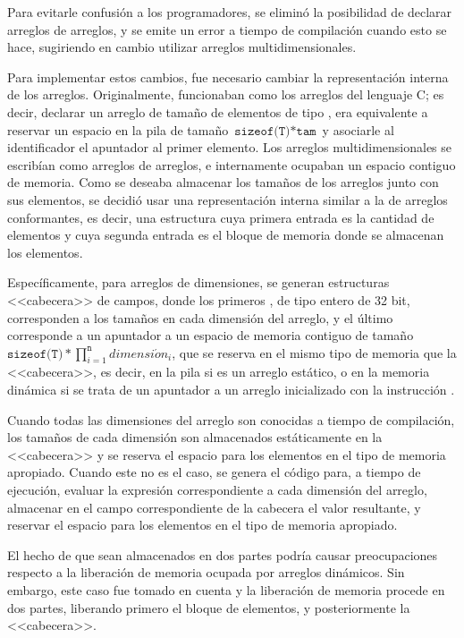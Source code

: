 Para evitarle confusión a los programadores, se eliminó la posibilidad de
declarar arreglos de arreglos, y se emite un error a tiempo de compilación
cuando esto se hace, sugiriendo en cambio utilizar arreglos multidimensionales.

Para implementar estos cambios, fue necesario cambiar la representación interna
de los arreglos. Originalmente, funcionaban como los arreglos del lenguaje C; es
decir, declarar un arreglo  de tamaño  de elementos de
tipo , era equivalente a reservar un espacio en la pila de tamaño
$\texttt{sizeof(T)} * \texttt{tam}$ y asociarle al identificador  el
apuntador al primer elemento. Los arreglos multidimensionales se escribían como
arreglos de arreglos, e internamente ocupaban un espacio contiguo de memoria.
Como se deseaba almacenar los tamaños de los arreglos junto con sus elementos,
se decidió usar una representación interna similar a la de arreglos
conformantes, es decir, una estructura cuya primera entrada es la cantidad de
elementos y cuya segunda entrada es el bloque de memoria donde se almacenan los
elementos.

Específicamente, para arreglos de  dimensiones, se generan estructuras
<<cabecera>> de  campos, donde los primeros , de tipo
entero de 32 bit, corresponden a los tamaños en cada dimensión del arreglo, y el
último corresponde a un apuntador a un espacio de memoria contiguo de tamaño
$\texttt{sizeof(T)} * \prod\limits_{i=1}^\texttt{n} dimensi\acute{o}n_i$, que se
reserva en el mismo tipo de memoria que la <<cabecera>>, es decir, en la pila si
es un arreglo estático, o en la memoria dinámica si se trata de un apuntador a
un arreglo inicializado con la instrucción .

Cuando todas las dimensiones del arreglo son conocidas a tiempo de compilación,
los tamaños de cada dimensión son almacenados estáticamente en la <<cabecera>> y
se reserva el espacio para los elementos en el tipo de memoria apropiado. Cuando
este no es el caso, se genera el código para, a tiempo de ejecución, evaluar la
expresión correspondiente a cada dimensión del arreglo, almacenar en el campo
correspondiente de la cabecera el valor resultante, y reservar el espacio para
los elementos en el tipo de memoria apropiado.

El hecho de que sean almacenados en dos partes podría causar preocupaciones
respecto a la liberación de memoria ocupada por arreglos dinámicos. Sin embargo,
este caso fue tomado en cuenta y la liberación de memoria procede en dos partes,
liberando primero el bloque de elementos, y posteriormente la <<cabecera>>.


